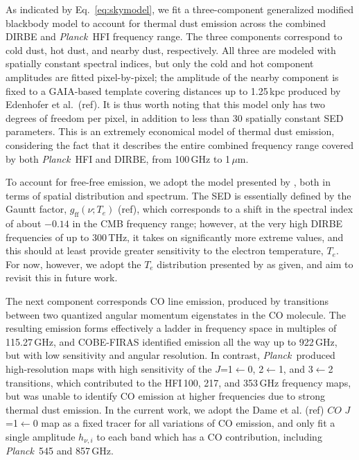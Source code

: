 \documentclass{aa}
\def\Planck{\textit{Planck}}
\begin{document}
As indicated by Eq.~\eqref{eq:skymodel}, we fit a three-component
generalized modified blackbody model to account for thermal dust
emission across the combined DIRBE and \Planck\ HFI frequency
range. The three components correspond to cold dust, hot dust, and
nearby dust, respectively. All three are modeled with spatially
constant spectral indices, but only the cold and hot component
amplitudes are fitted pixel-by-pixel; the amplitude of the nearby
component is fixed to a GAIA-based template covering distances up to
1.25\,kpc produced by Edenhofer et al.\ (ref). It is thus worth noting
that this model only has two degrees of freedom per pixel, in addition
to less than 30 spatially constant SED parameters. This is an
extremely economical model of thermal dust emission, considering the
fact that it describes the entire combined frequency range covered by
both \Planck\ HFI and DIRBE, from 100\,GHz to 1\,$\mu$m.

To account for free-free emission, we adopt the model presented by
\citet{planck2014-a11}, both in terms of spatial distribution and
spectrum. The SED is essentially defined by the Gauntt factor,
$g_{\mathrm{ff}}(\nu; T_e)$ (ref), which corresponds to a shift in the
spectral index of about $-0.14$ in the CMB frequency range; however,
at the very high DIRBE frequencies of up to 300\,THz, it takes on
significantly more extreme values, and this should at least provide
greater sensitivity to the electron temperature, $T_e$. For now,
however, we adopt the $T_e$ distribution presented by
\citet{planck2014-a11} as given, and aim to revisit this in future work.

The next component corresponds CO line emission, produced by
transitions between two quantized angular momentum eigenstates in the
CO molecule. The resulting emission forms effectively a ladder in
frequency space in multiples of 115.27\,GHz, and COBE-FIRAS identified
emission all the way up to 922\,GHz, but with low sensitivity and
angular resolution. In contrast, \Planck\ produced high-resolution
maps with high sensitivity of the $J$=1$\leftarrow$0, 2$\leftarrow$1,
and 3$\leftarrow$2 transitions, which contributed to the HFI\,100,
217, and 353\,GHz frequency maps, but was unable to identify CO
emission at higher frequencies due to strong thermal dust emission. In
the current work, we adopt the Dame et al. (ref) $CO$
$J$=1$\leftarrow$0 map as a fixed tracer for all variations of CO
emission, and only fit a single amplitude $h_{\nu,i}$ to each band
which has a CO contribution, including \Planck\ 545 and 857\,GHz.
\end{document}
